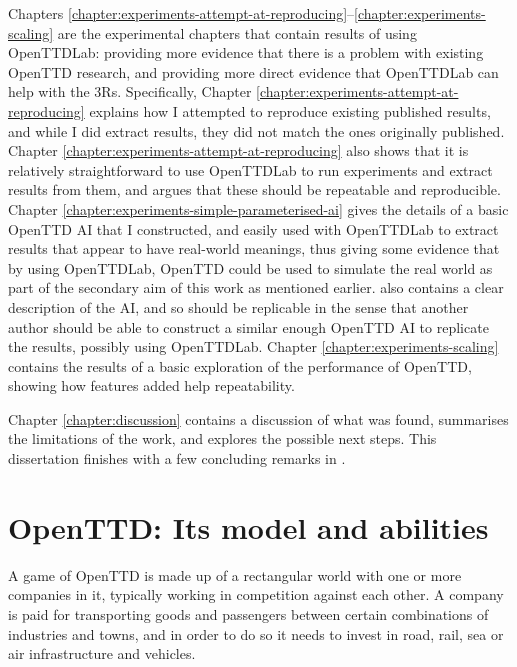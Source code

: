 \documentclass[logo,msc,dsti]{style/infthesis}    %
\begin{document}
{Chapters \ref{chapter:experiments-attempt-at-reproducing}--\ref{chapter:experiments-scaling} are the experimental chapters that contain results of using OpenTTDLab: providing more evidence that there is a problem with existing OpenTTD research, and providing more direct evidence that OpenTTDLab can help with the 3Rs. Specifically, Chapter \ref{chapter:experiments-attempt-at-reproducing} explains how I attempted to reproduce existing published results, and while I did extract results, they did not match the ones originally published. Chapter \ref{chapter:experiments-attempt-at-reproducing} also shows that it is relatively straightforward to use OpenTTDLab to run experiments and extract results from them, and argues that these should be repeatable and reproducible. Chapter \ref{chapter:experiments-simple-parameterised-ai} gives the details of a basic OpenTTD AI that I constructed, and easily used with OpenTTDLab to extract results that appear to have real-world meanings, thus giving some evidence that by using OpenTTDLab, OpenTTD could be used to simulate the real world as part of the secondary aim of this work as mentioned earlier.  also contains a clear description of the AI, and so should be replicable in the sense that another author should be able to construct a similar enough OpenTTD AI to replicate the results, possibly using OpenTTDLab. Chapter \ref{chapter:experiments-scaling} contains the results of a basic exploration of the performance of OpenTTD, showing how features added help repeatability.

Chapter \ref{chapter:discussion} contains a discussion of what was found, summarises the limitations of the work, and explores the possible next steps. This dissertation finishes with a few concluding remarks in .

\chapter{OpenTTD: Its model and abilities}
\label{chapter:openttd-model-and-abilities}

A game of OpenTTD is made up of a rectangular world with one or more companies in it, typically working in competition against each other. A company is paid for transporting goods and passengers between certain combinations of industries and towns, and in order to do so it needs to invest in road, rail, sea or air infrastructure and vehicles.

}
\end{document}
